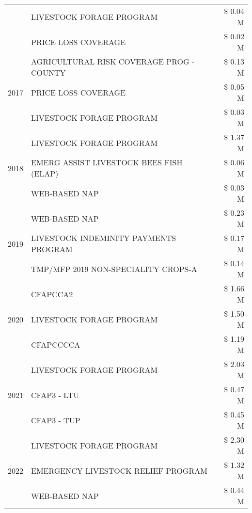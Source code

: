 \begin{tabular}{llr}
 & LIVESTOCK FORAGE PROGRAM & \$ 0.04 M \\
 & PRICE LOSS COVERAGE & \$ 0.02 M \\
\cline{1-3}
\multirow[t]{3}{*}{2017} & AGRICULTURAL RISK COVERAGE PROG - COUNTY & \$ 0.13 M \\
 & PRICE LOSS COVERAGE & \$ 0.05 M \\
 & LIVESTOCK FORAGE PROGRAM & \$ 0.03 M \\
\cline{1-3}
\multirow[t]{3}{*}{2018} & LIVESTOCK FORAGE PROGRAM & \$ 1.37 M \\
 & EMERG ASSIST LIVESTOCK BEES FISH (ELAP) & \$ 0.06 M \\
 & WEB-BASED NAP & \$ 0.03 M \\
\cline{1-3}
\multirow[t]{3}{*}{2019} & WEB-BASED NAP & \$ 0.23 M \\
 & LIVESTOCK INDEMINITY PAYMENTS PROGRAM & \$ 0.17 M \\
 & TMP/MFP 2019 NON-SPECIALITY CROPS-A & \$ 0.14 M \\
\cline{1-3}
\multirow[t]{3}{*}{2020} & CFAPCCA2 & \$ 1.66 M \\
 & LIVESTOCK FORAGE PROGRAM & \$ 1.50 M \\
 & CFAPCCCCA & \$ 1.19 M \\
\cline{1-3}
\multirow[t]{3}{*}{2021} & LIVESTOCK FORAGE PROGRAM & \$ 2.03 M \\
 & CFAP3 - LTU & \$ 0.47 M \\
 & CFAP3 - TUP & \$ 0.45 M \\
\cline{1-3}
\multirow[t]{3}{*}{2022} & LIVESTOCK FORAGE PROGRAM & \$ 2.30 M \\
 & EMERGENCY LIVESTOCK RELIEF PROGRAM & \$ 1.32 M \\
 & WEB-BASED NAP & \$ 0.44 M \\
\cline{1-3}
\bottomrule
\end{tabular}
